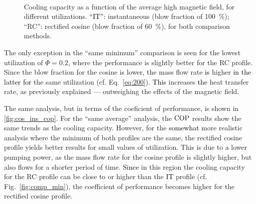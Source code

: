 \documentclass[referee]{svjour3}
\begin{document}
\begin{figure}[!ht]
  \centering
\,
\,
  \caption{Cooling capacity as a function of the  average high magnetic field, for different utilizations. \textcolor{black}{``IT''}: instantaneous (blow fraction of \SI{100}{\percent}); ``RC'': rectified cosine  (blow fraction of \SI{60}{\percent}), for both comparison methods.}
 \label{fig:cos_ins}
\end{figure}

The only exception in the ``same minimum'' comparison is seen for the lowest utilization of $\Phi = 0.2$, where the performance is slightly better for the RC profile. Since the blow fraction for the cosine is lower, the mass flow rate \textcolor{black}{is} higher \textcolor{black}{in the latter for} the same utilization (cf. Eq.~\eqref{eq:200}). \textcolor{black}{This} increases \textcolor{black}{the} heat transfer rate, as previously explained ---  outweighing the effects of the magnetic field.


The same analysis, but in terms of the coeficient of performance, is shown in \autoref{fig:cos_ins_cop}. For the ``same average'' analysis, the $\mathrm{COP}$ results show the same trends as the cooling capacity. However, for the \textcolor{black}{somewhat} more realistic analysis where the minimum of both profiles are the same, the rectified cosine profile yields better results for small values of utilization. This is due to \textcolor{black}{a} lower pumping power, as the mass flow rate for the cosine profile is slightly higher, but also flows for a shorter period of time. \textcolor{black}{Since} in this region the cooling capacity for the RC profile can be close to or higher than the \textcolor{black}{IT} profile (cf. Fig.~\autoref{fig:comp_min}), the coefficient of performance becomes higher for the rectified cosine profile.
\end{document}
